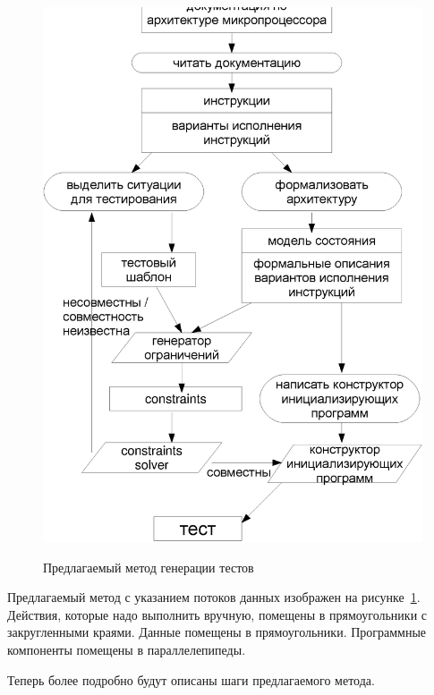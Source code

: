 \documentclass[14pt]{extreport}
\begin{document}
\begin{figure}[p] \center
  \includegraphics[width=\textwidth]{2.theor/process_full}\\
  \caption{Предлагаемый метод генерации тестов}\label{process}
\end{figure}

Предлагаемый метод с указанием потоков данных изображен на
рисунке~\ref{process}. Действия, которые надо выполнить вручную, помещены в
прямоугольники с закругленными краями. Данные помещены в прямоугольники.
Программные компоненты помещены в параллелепипеды.

Теперь более подробно будут описаны шаги предлагаемого метода.
\end{document}
